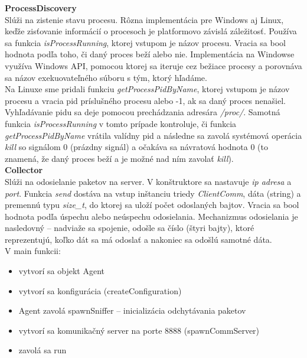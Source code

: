 \documentclass[a4paper,12pt]{article}
\begin{document}
\textbf{ProcessDiscovery} \\

Slúži na zistenie stavu procesu. Rôzna implementácia pre Windows aj Linux, keďže zisťovanie informácií o procesoch je platformovo závislá záležitosť. Používa sa funkcia \textit{isProcessRunning}, ktorej vstupom je názov procesu. Vracia sa bool hodnota podľa toho, či daný proces beží alebo nie. Implementácia na Windowse využíva Windows API, pomocou ktorej sa iteruje cez bežiace procesy a porovnáva sa názov exekuovateľného súboru s tým, ktorý hľadáme. \\

Na Linuxe sme pridali funkciu \textit{getProcessPidByName}, ktorej vstupom je názov procesu a vracia pid príslušného procesu alebo -1, ak sa daný proces nenašiel. Vyhľadávanie pidu sa deje pomocou prechádzania adresára \textit{/proc/}. Samotná funkcia \textit{isProcessRunning} v tomto prípade kontroluje, či funkcia \textit{getProcessPidByName} vrátila valídny pid a následne sa zavolá systémová operácia \textit{kill} so signálom 0 (prázdny signál) a očakáva sa návratová hodnota 0 (to znamená, že daný proces beží a je možné nad ním zavolať \textit{kill}). \\

\textbf{Collector} \\

Slúži na odosielanie paketov na server. V konštruktore sa nastavuje \textit{ip adresa} a \textit{port}. Funkcia \textit{send} dostáva na vstup inštanciu triedy \textit{ClientComm}, dáta (string) a premennú typu \textit{size\_t}, do ktorej sa uloží počet odoslaných bajtov. Vracia sa bool hodnota podľa úspechu alebo neúspechu odosielania. Mechanizmus odosielania je nasledovný – nadviaže sa spojenie, odošle sa číslo (štyri bajty), ktoré reprezentujú, koľko dát sa má odoslať a nakoniec sa odošlú samotné dáta. \\

\noindent V main funkcii:
\begin{itemize} 
	\item vytvorí sa objekt Agent
	\item vytvorí sa konfigurácia (createConfiguration)
	\item Agent zavolá spawnSniffer – inicializácia odchytávania paketov
	\item vytvorí sa komunikačný server na porte 8888 (spawnCommServer)
	\item zavolá sa run \\
\end{itemize}
\end{document}
